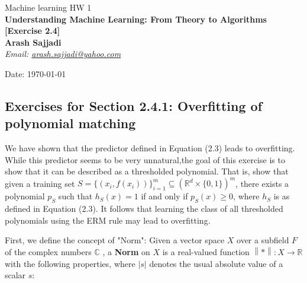 \documentclass[]{book}
\theoremstyle{definition}
\begin{document}
\begin{center}
{\Large Machine learning \hspace{0.5cm} HW 1}\\
\textbf{Understanding Machine Learning: From Theory to Algorithms [Exercise 2.4]}\\
\textbf{Arash Sajjadi}\\ %
\textit{Email: \href{mailto:arash.sajjadi@yahoo.com}{arash.sajjadi@yahoo.com}} 

Date: \today %
\end{center}

\vspace{0.2 cm}


\subsection*{Exercises for Section 2.4.1: Overfitting of polynomial matching}
We have shown that the predictor defined in Equation (2.3) leads to overfitting. While this predictor seems to be very unnatural,the goal of this exercise is to show that it can be described as a thresholded polynomial. That is, show that given a training set $S=\{(x_i,f(x_i))\}^m_{i=1}\subseteq (\mathbb{R}^d\times \{0,1\})^m$, there exists a polynomial $p_S$ such that $h_S(x)=1$ if and only if $p_S(x)\geq 0$, where $h_S$ is as defined in Equation (2.3). It follows that learning the class of all thresholded polynomials using the ERM rule may lead to overfitting.

\vspace{0.5cm}

First, we define the concept of "Norm": Given a vector space $\displaystyle X$ over a subfield $F$ of the complex numbers $\mathbb C$ , a \textbf{Norm} on $\displaystyle X$ is a real-valued function $\displaystyle \left\| * \right\|:X\to \mathbb R $ with the following properties, where $\displaystyle |s|$ denotes the usual absolute value of a scalar $\displaystyle s$:
\end{document}
